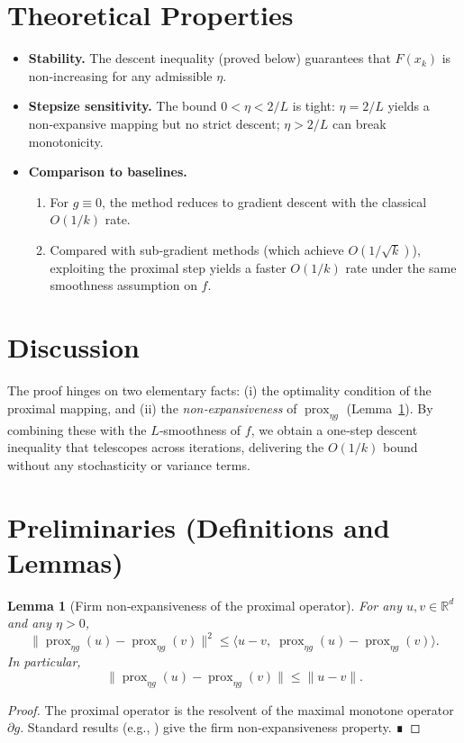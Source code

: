\documentclass{article}
\newtheorem{lemma}{Lemma}
\newcommand{\prox}{\operatorname{prox}}
\begin{document}
\section*{Theoretical Properties}
\begin{itemize}
\item \textbf{Stability.} The descent inequality (proved below) guarantees that $F(x_{k})$ is non‑increasing for any admissible $\eta$.
\item \textbf{Stepsize sensitivity.} The bound $0<\eta<2/L$ is tight: $\eta=2/L$ yields a non‑expansive mapping but no strict descent; $\eta>2/L$ can break monotonicity.
\item \textbf{Comparison to baselines.}
    \begin{enumerate}[label=\alph*)]
        \item For $g\equiv0$, the method reduces to gradient descent with the classical $O(1/k)$ rate.
        \item Compared with sub‑gradient methods (which achieve $O(1/\sqrt{k})$), exploiting the proximal step yields a faster $O(1/k)$ rate under the same smoothness assumption on $f$.
    \end{enumerate}
\end{itemize}

\section*{Discussion}
The proof hinges on two elementary facts: (i) the optimality condition of the proximal mapping, and (ii) the \emph{non‑expansiveness} of $\prox_{\eta g}$ (Lemma~\ref{lem:nonexp}). By combining these with the $L$‑smoothness of $f$, we obtain a one‑step descent inequality that telescopes across iterations, delivering the $O(1/k)$ bound without any stochasticity or variance terms.

\section*{Preliminaries (Definitions and Lemmas)}
\begin{lemma}[Firm non‑expansiveness of the proximal operator]\label{lem:nonexp}
For any $u,v\in\mathbb{R}^{d}$ and any $\eta>0$,
\[
\big\|\prox_{\eta g}(u)-\prox_{\eta g}(v)\big\|^{2}
\le\langle u-v,\;\prox_{\eta g}(u)-\prox_{\eta g}(v)\rangle .
\]
In particular,
\[
\big\|\prox_{\eta g}(u)-\prox_{\eta g}(v)\big\|
\le\|u-v\|.
\]
\end{lemma}
\begin{proof}
The proximal operator is the resolvent of the maximal monotone operator $\partial g$. Standard results (e.g., \cite{rockafellar1970}) give the firm non‑expansiveness property. ∎
\end{proof}
\end{document}
